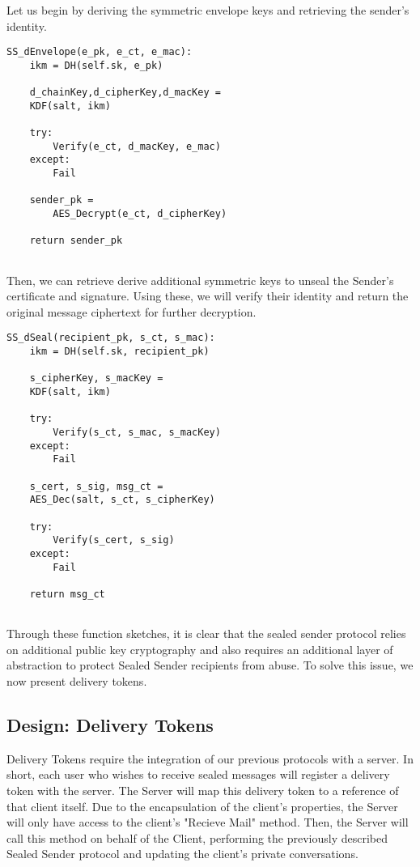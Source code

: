 \documentclass[conference]{IEEEtran}
\begin{document}
Let us begin by deriving the symmetric envelope keys and retrieving the sender's identity.
\newline
\begin{Verbatim}[frame=single]
SS_dEnvelope(e_pk, e_ct, e_mac):
    ikm = DH(self.sk, e_pk)
    
    d_chainKey,d_cipherKey,d_macKey =
    KDF(salt, ikm)

    try:
        Verify(e_ct, d_macKey, e_mac)
    except:
        Fail

    sender_pk = 
        AES_Decrypt(e_ct, d_cipherKey)

    return sender_pk
        
\end{Verbatim}

Then, we can retrieve derive additional symmetric keys to unseal the Sender's certificate and signature. Using these, we will verify their identity and return the original message ciphertext for further decryption.
\newline

\begin{Verbatim}[frame=single]
SS_dSeal(recipient_pk, s_ct, s_mac):
    ikm = DH(self.sk, recipient_pk)
    
    s_cipherKey, s_macKey =
    KDF(salt, ikm)

    try:
        Verify(s_ct, s_mac, s_macKey)
    except:
        Fail
        
    s_cert, s_sig, msg_ct =
    AES_Dec(salt, s_ct, s_cipherKey)

    try:
        Verify(s_cert, s_sig)
    except:
        Fail

    return msg_ct
        
\end{Verbatim}
Through these function sketches, it is clear that the sealed sender protocol relies on additional public key cryptography and also requires an additional layer of abstraction to protect Sealed Sender recipients from abuse. To solve this issue, we now present delivery tokens.

\subsection{Design: Delivery Tokens}
Delivery Tokens require the integration of our previous protocols with a server. In short, each user who wishes to receive sealed messages will register a delivery token with the server. The Server will map this delivery token to a reference of that client itself. Due to the encapsulation of the client's properties, the Server will only have access to the client's "Recieve Mail" method. Then, the Server will call this method on behalf of the Client, performing the previously described Sealed Sender protocol and updating the client's private conversations. 
\newline
\end{document}
